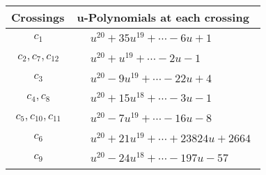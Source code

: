 \documentclass[1p]{elsarticle_modified}
\theoremstyle{definition}
\begin{document}
\begin{tabular}{m{50pt}|m{274pt}}
Crossings & \hspace{64pt}u-Polynomials at each crossing \\
\hline $$\begin{aligned}c_{1}\end{aligned}$$&$\begin{aligned}
&u^{20}+35 u^{19}+\cdots-6 u+1
\end{aligned}$\\
\hline $$\begin{aligned}c_{2},c_{7},c_{12}\end{aligned}$$&$\begin{aligned}
&u^{20}+u^{19}+\cdots-2 u-1
\end{aligned}$\\
\hline $$\begin{aligned}c_{3}\end{aligned}$$&$\begin{aligned}
&u^{20}-9 u^{19}+\cdots-22 u+4
\end{aligned}$\\
\hline $$\begin{aligned}c_{4},c_{8}\end{aligned}$$&$\begin{aligned}
&u^{20}+15 u^{18}+\cdots-3 u-1
\end{aligned}$\\
\hline $$\begin{aligned}c_{5},c_{10},c_{11}\end{aligned}$$&$\begin{aligned}
&u^{20}-7 u^{19}+\cdots-16 u-8
\end{aligned}$\\
\hline $$\begin{aligned}c_{6}\end{aligned}$$&$\begin{aligned}
&u^{20}+21 u^{19}+\cdots+23824 u+2664
\end{aligned}$\\
\hline $$\begin{aligned}c_{9}\end{aligned}$$&$\begin{aligned}
&u^{20}-24 u^{18}+\cdots-197 u-57
\end{aligned}$\\
\hline
\end{tabular}\\~\\
\newpage\renewcommand{\arraystretch}{1}
\end{document}
